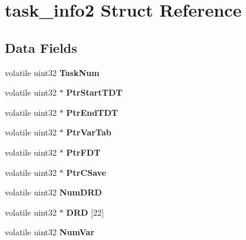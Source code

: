 \hypertarget{structtask__info2}{}\section{task\+\_\+info2 Struct Reference}
\label{structtask__info2}
\subsection*{Data Fields}
\begin{DoxyCompactItemize}
\item 
\mbox{\label{structtask__info2_a08fe42c80f30f6c5f72414da3d78526a}} 
volatile uint32 {\bfseries Task\+Num}
\item 
\mbox{\label{structtask__info2_a4f21c0a5826615a4c851b3054bdb0475}} 
volatile uint32 $\ast$ {\bfseries Ptr\+Start\+T\+DT}
\item 
\mbox{\label{structtask__info2_a9ae288366f04df8e761f18a2a44c11f2}} 
volatile uint32 $\ast$ {\bfseries Ptr\+End\+T\+DT}
\item 
\mbox{\label{structtask__info2_aa0b84af5aca3adea3c3204365828572f}} 
volatile uint32 $\ast$ {\bfseries Ptr\+Var\+Tab}
\item 
\mbox{\label{structtask__info2_acbcf0d9edd6e2c0355e7b2851fe8d3eb}} 
volatile uint32 $\ast$ {\bfseries Ptr\+F\+DT}
\item 
\mbox{\label{structtask__info2_a09ad3ac7bec5512d4365359be2eda239}} 
volatile uint32 $\ast$ {\bfseries Ptr\+C\+Save}
\item 
\mbox{\label{structtask__info2_ac347d55adc2c4d4afb56ebf03a3954d4}} 
volatile uint32 {\bfseries Num\+D\+RD}
\item 
\mbox{\label{structtask__info2_a8f79e340e49424a8b1e4756585315656}} 
volatile uint32 $\ast$ {\bfseries D\+RD} \mbox{[}22\mbox{]}
\item 
\mbox{\label{structtask__info2_a7c1eab1197065998432aaa45019def65}} 
volatile uint32 {\bfseries Num\+Var}
\item 

\end{DoxyCompactItemize}
